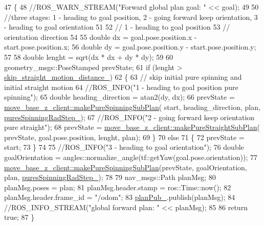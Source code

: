 \begin{DoxyCode}
47 \{
48     \textcolor{comment}{//ROS\_WARN\_STREAM("Forward global plan goal: " << goal);}
49 
50     \textcolor{comment}{//three stages: 1 - heading to goal position, 2 - going forward keep orientation, 3 - heading to goal
       orientation}
51 
52     \textcolor{comment}{// 1 - heading to goal position}
53     \textcolor{comment}{// orientation direction}
54 
55     \textcolor{keywordtype}{double} dx = goal.pose.position.x - start.pose.position.x;
56     \textcolor{keywordtype}{double} dy = goal.pose.position.y - start.pose.position.y;
57 
58     \textcolor{keywordtype}{double} lenght = sqrt(dx * dx + dy * dy);
59 
60     geometry\_msgs::PoseStamped prevState;
61     \textcolor{keywordflow}{if} (lenght > \hyperlink{classmove__base__z__client_1_1forward__global__planner_1_1ForwardGlobalPlanner_ae33082b9dd81dd3ce8d3e68a6c032c61}{skip\_straight\_motion\_distance\_})
62     \{
63         \textcolor{comment}{// skip initial pure spinning and initial straight motion}
64         \textcolor{comment}{//ROS\_INFO("1 - heading to goal position pure spinning");}
65         \textcolor{keywordtype}{double} heading\_direction = atan2(dy, dx);
66         prevState = \hyperlink{namespacemove__base__z__client_a01da021a9b88189c076e8740d5d2dfe5}{move\_base\_z\_client::makePureSpinningSubPlan}(
      start, heading\_direction, plan, \hyperlink{classmove__base__z__client_1_1forward__global__planner_1_1ForwardGlobalPlanner_a91bac0160c7b6ea54f4188b60f7fcf89}{puresSpinningRadStep\_});
67         \textcolor{comment}{//ROS\_INFO("2 - going forward keep orientation pure straight");}
68         prevState = \hyperlink{namespacemove__base__z__client_aeda8dd87896b3e31221df66d02313358}{move\_base\_z\_client::makePureStraightSubPlan}(
      prevState, goal.pose.position, lenght, plan);
69     \}
70     \textcolor{keywordflow}{else}
71     \{
72         prevState = start;
73     \}
74 
75     \textcolor{comment}{//ROS\_INFO("3 - heading to goal orientation");}
76     \textcolor{keywordtype}{double} goalOrientation = angles::normalize\_angle(tf::getYaw(goal.pose.orientation));
77     \hyperlink{namespacemove__base__z__client_a01da021a9b88189c076e8740d5d2dfe5}{move\_base\_z\_client::makePureSpinningSubPlan}(prevState, 
      goalOrientation, plan, \hyperlink{classmove__base__z__client_1_1forward__global__planner_1_1ForwardGlobalPlanner_a91bac0160c7b6ea54f4188b60f7fcf89}{puresSpinningRadStep\_});
78 
79     nav\_msgs::Path planMsg;
80     planMsg.poses = plan;
81     planMsg.header.stamp = ros::Time::now();
82     planMsg.header.frame\_id = \textcolor{stringliteral}{"/odom"};
83     \hyperlink{classmove__base__z__client_1_1forward__global__planner_1_1ForwardGlobalPlanner_a324f5df4d47440e1ebddb83ee53d5908}{planPub\_}.publish(planMsg);
84     \textcolor{comment}{//ROS\_INFO\_STREAM("global forward plan: " << planMsg);}
85 
86     \textcolor{keywordflow}{return} \textcolor{keyword}{true};
87 \}
\end{DoxyCode}


